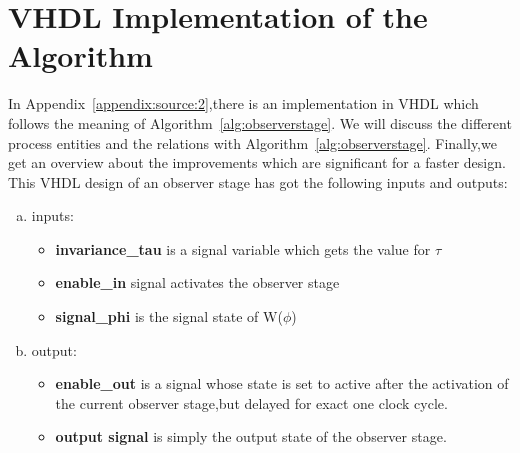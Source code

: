 \section{VHDL Implementation of the Algorithm}  
\label{chapter:sub:2}
In Appendix~\ref{appendix:source:2},there is an implementation in VHDL which follows the meaning of Algorithm~\ref{alg:observerstage}.
We will discuss the different process entities and the relations with Algorithm~\ref{alg:observerstage}.
Finally,we get an overview about the improvements which are significant for a faster design. 
This VHDL design of an observer stage has got the following inputs and outputs:
\begin{enumerate}[(a)]
\item inputs:
\begin{itemize}
\item \textbf{invariance\_tau} is a signal variable which gets the value for $\tau$
\item \textbf{enable\_in} signal activates the observer stage
\item \textbf{signal\_phi} is the signal state of W($\phi$)
\end{itemize}
\newpage
\item output:
\begin{itemize}
\item \textbf{enable\_out} is a signal whose state is set to active after the activation of the current observer stage,but delayed for exact one clock cycle.   
\item \textbf{output signal} is simply the output state of the observer stage.
\end{itemize}
\end{enumerate}

